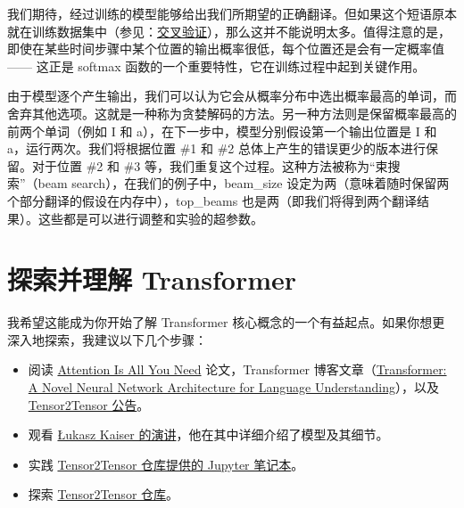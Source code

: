 \documentclass[cn,hazy,blue,10pt,normal]{elegantnote}
\begin{document}
我们期待，经过训练的模型能够给出我们所期望的正确翻译。但如果这个短语原本就在训练数据集中（参见：\href{https://www.youtube.com/watch?v=TIgfjmp-4BA}{交叉验证}），那么这并不能说明太多。值得注意的是，即使在某些时间步骤中某个位置的输出概率很低，每个位置还是会有一定概率值 —— 这正是 softmax 函数的一个重要特性，它在训练过程中起到关键作用。

由于模型逐个产生输出，我们可以认为它会从概率分布中选出概率最高的单词，而舍弃其他选项。这就是一种称为贪婪解码的方法。另一种方法则是保留概率最高的前两个单词（例如 I 和 a），在下一步中，模型分别假设第一个输出位置是 I 和 a，运行两次。我们将根据位置 \#1 和 \#2 总体上产生的错误更少的版本进行保留。对于位置 \#2 和 \#3 等，我们重复这个过程。这种方法被称为“束搜索”（beam search），在我们的例子中，beam\_size 设定为两（意味着随时保留两个部分翻译的假设在内存中），top\_beams 也是两（即我们将得到两个翻译结果）。这些都是可以进行调整和实验的超参数。

\section{探索并理解 Transformer}

我希望这能成为你开始了解 Transformer 核心概念的一个有益起点。如果你想更深入地探索，我建议以下几个步骤：
\begin{itemize}
    \item 阅读 \href{https://arxiv.org/abs/1706.03762}{Attention Is All You Need} 论文，Transformer 博客文章（\href{https://ai.googleblog.com/2017/08/transformer-novel-neural-network.html}{Transformer: A Novel Neural Network Architecture for Language Understanding}），以及 \href{https://ai.googleblog.com/2017/06/accelerating-deep-learning-research.html}{Tensor2Tensor 公告}。
    \item 观看 \href{https://www.youtube.com/watch?v=rBCqOTEfxvg}{Łukasz Kaiser 的演讲}，他在其中详细介绍了模型及其细节。
    \item 实践 \href{https://colab.research.google.com/github/tensorflow/tensor2tensor/blob/master/tensor2tensor/notebooks/hello_t2t.ipynb}{Tensor2Tensor 仓库提供的 Jupyter 笔记本}。
    \item 探索 \href{https://github.com/tensorflow/tensor2tensor}{Tensor2Tensor 仓库}。
\end{itemize}
\end{document}
